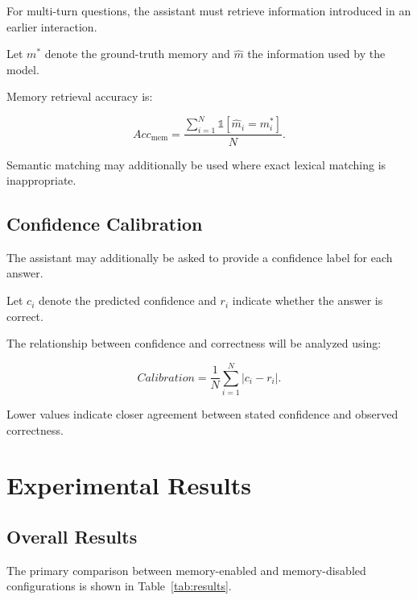 \documentclass[conference]{IEEEtran}
\begin{document}
    For multi-turn questions, the assistant must retrieve information
    introduced in an earlier interaction.
    
    Let $m^*$ denote the ground-truth memory and $\hat{m}$ the information
    used by the model.
    
    Memory retrieval accuracy is:
    
    \begin{equation}
    Acc_{\mathrm{mem}}
    =
    \frac{
    \sum_{i=1}^{N}
    \mathbb{1}[\hat{m}_i = m_i^*]
    }{
    N
    }.
    \end{equation}
    
    Semantic matching may additionally be used where exact lexical matching
    is inappropriate.
    
    \subsection{Confidence Calibration}
    
    The assistant may additionally be asked to provide a confidence label
    for each answer.
    
    Let $c_i$ denote the predicted confidence and $r_i$ indicate whether the
    answer is correct.
    
    The relationship between confidence and correctness will be analyzed
    using:
    
    \begin{equation}
    Calibration =
    \frac{1}{N}
    \sum_{i=1}^{N}
    |c_i-r_i|.
    \end{equation}
    
    Lower values indicate closer agreement between stated confidence and
    observed correctness.
    
    
    \section{Experimental Results}
    
    \subsection{Overall Results}
    
    The primary comparison between memory-enabled and memory-disabled
    configurations is shown in Table~\ref{tab:results}.
    
\end{document}
